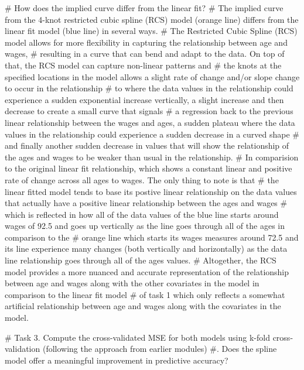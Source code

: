 \documentclass[
  letterpaper,
  DIV=11,
  numbers=noendperiod]{scrreprt}
\newenvironment{Shaded}{\begin{snugshade}}{\end{snugshade}}
\newcommand{\CommentTok}[1]{\textcolor[rgb]{0.37,0.37,0.37}{#1}}
\begin{document}
{\begin{Shaded}
\begin{Highlighting}[]
\CommentTok{\# How does the implied curve differ from the linear fit?}
\CommentTok{\# The implied curve from the 4{-}knot restricted cubic spline (RCS) model (orange line) differs from the linear fit model (blue line) in several ways.}
\CommentTok{\# The Restricted Cubic Spline (RCS) model allows for more flexibility in capturing the relationship between age and wages, }
\CommentTok{\# resulting in a curve that can bend and adapt to the data. On top of that, the RCS model can capture non{-}linear patterns and }
\CommentTok{\# the knots at the specified locations in the model allows a slight rate of change and/or slope change to occur in the relationship }
\CommentTok{\# to where the data values in the relationship could experience a sudden exponential increase vertically, a slight increase and then decrease to create a small curve that signals}
\CommentTok{\# a regression back to the previous linear relationship between the wages and ages, a sudden plateau where the data values in the relationship could experience a sudden decrease in a curved shape}
\CommentTok{\# and finally another sudden decrease in values that will show the relationship of the ages and wages to be weaker than usual in the relationship.}
\CommentTok{\# In comparision to the original linear fit relationship, which shows a constant linear and positive rate of change across all ages to wages. The only thing to note is that}
\CommentTok{\# the linear fitted model tends to base its postive linear relationship on the data values that actually have a positive linear relationship between the ages and wages}
\CommentTok{\# which is reflected in how all of the data values of the blue line starts around wages of 92.5 and goes up vertically as the line goes through all of the ages in comparison to the}
\CommentTok{\# orange line which starts its wages measures around 72.5 and its line experience many changes (both vertically and horizontally) as the data line relationship goes through all of the ages values.}
\CommentTok{\# Altogether, the RCS model provides a more nuanced and accurate representation of the relationship between age and wages along with the other covariates in the model in comparison to the linear fit model}
\CommentTok{\# of task 1 which only reflects a somewhat artificial relationship between age and wages along with the covariates in the model.}


\CommentTok{\# Task 3. Compute the cross{-}validated MSE for both models using k{-}fold cross{-}validation (following the approach from earlier modules)}
\CommentTok{\#. Does the spline model offer a meaningful improvement in predictive accuracy?}


\end{Highlighting}
\end{Shaded}}
\end{document}

